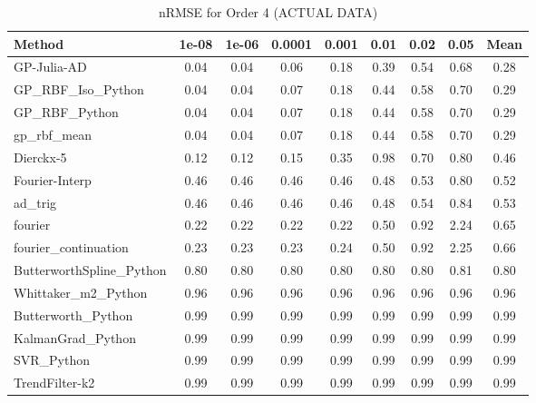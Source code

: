 \begin{table}[htbp]
\centering
\caption{nRMSE for Order 4 (ACTUAL DATA)}
\label{tab:order_4}
\tiny
\begin{tabular}{lcccccccc}
\toprule
\textbf{Method} & \textbf{1e-08} & \textbf{1e-06} & \textbf{0.0001} & \textbf{0.001} & \textbf{0.01} & \textbf{0.02} & \textbf{0.05} & \textbf{Mean} \\
\midrule
GP-Julia-AD & 0.04 & 0.04 & 0.06 & 0.18 & 0.39 & 0.54 & 0.68 & 0.28 \\
GP_RBF_Iso_Python & 0.04 & 0.04 & 0.07 & 0.18 & 0.44 & 0.58 & 0.70 & 0.29 \\
GP_RBF_Python & 0.04 & 0.04 & 0.07 & 0.18 & 0.44 & 0.58 & 0.70 & 0.29 \\
gp_rbf_mean & 0.04 & 0.04 & 0.07 & 0.18 & 0.44 & 0.58 & 0.70 & 0.29 \\
Dierckx-5 & 0.12 & 0.12 & 0.15 & 0.35 & 0.98 & 0.70 & 0.80 & 0.46 \\
Fourier-Interp & 0.46 & 0.46 & 0.46 & 0.46 & 0.48 & 0.53 & 0.80 & 0.52 \\
ad_trig & 0.46 & 0.46 & 0.46 & 0.46 & 0.48 & 0.54 & 0.84 & 0.53 \\
fourier & 0.22 & 0.22 & 0.22 & 0.22 & 0.50 & 0.92 & 2.24 & 0.65 \\
fourier_continuation & 0.23 & 0.23 & 0.23 & 0.24 & 0.50 & 0.92 & 2.25 & 0.66 \\
ButterworthSpline_Python & 0.80 & 0.80 & 0.80 & 0.80 & 0.80 & 0.80 & 0.81 & 0.80 \\
Whittaker_m2_Python & 0.96 & 0.96 & 0.96 & 0.96 & 0.96 & 0.96 & 0.96 & 0.96 \\
Butterworth_Python & 0.99 & 0.99 & 0.99 & 0.99 & 0.99 & 0.99 & 0.99 & 0.99 \\
KalmanGrad_Python & 0.99 & 0.99 & 0.99 & 0.99 & 0.99 & 0.99 & 0.99 & 0.99 \\
SVR_Python & 0.99 & 0.99 & 0.99 & 0.99 & 0.99 & 0.99 & 0.99 & 0.99 \\
TrendFilter-k2 & 0.99 & 0.99 & 0.99 & 0.99 & 0.99 & 0.99 & 0.99 & 0.99 \\
\bottomrule
\end{tabular}
\end{table}
